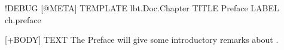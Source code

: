 \begin{lbt}
  !DEBUG
  [@META]
    TEMPLATE lbt.Doc.Chapter
    TITLE Preface
    LABEL ch.preface

  [+BODY]
    TEXT The Preface will give some introductory remarks about \lbtlogo.

\end{lbt}
